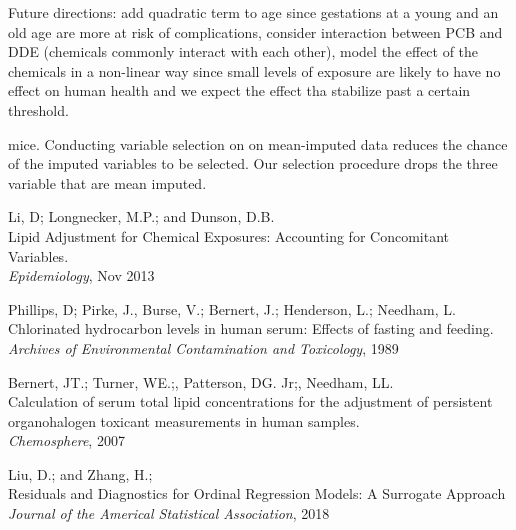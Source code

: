 \documentclass[10pt]{jmlr}%
\begin{document}
Future directions: add quadratic term to age since gestations at a young and an old age are more at risk of complications, consider interaction between PCB and DDE (chemicals commonly interact with each other), model the effect of the chemicals in a non-linear way since small levels of exposure are likely to have no effect on human health and we expect the effect tha stabilize past a certain threshold.

mice. Conducting variable selection on on mean-imputed data reduces the chance of the imputed variables to be selected. Our selection procedure drops the three variable that are mean imputed.


\newpage %
\begin{thebibliography}{99} %
	
	 Li, D; Longnecker, M.P.; and Dunson, D.B. \\
	\newblock Lipid Adjustment for Chemical Exposures: Accounting for Concomitant Variables.\\
	\newblock \emph{Epidemiology}, Nov 2013
	
	Phillips, D; Pirke, J., Burse, V.; Bernert, J.; Henderson, L.; Needham, L.\\
	\newblock Chlorinated hydrocarbon levels in human serum: Effects of fasting and feeding.\\
	\newblock \emph{Archives of Environmental Contamination and Toxicology}, 1989
	
	 Bernert, JT.; Turner, WE.;, Patterson, DG. Jr;, Needham, LL.\\
	\newblock Calculation of serum total lipid concentrations for the adjustment of persistent organohalogen toxicant measurements in human samples.\\
	\newblock \emph{Chemosphere}, 2007
	
	 Liu, D.; and Zhang, H.;\\
	\newblock Residuals and Diagnostics for Ordinal Regression Models: A Surrogate Approach\\
	\newblock \emph{Journal of the Americal Statistical Association}, 2018
	
\end{thebibliography}


\newpage
\appendix
\end{document}
